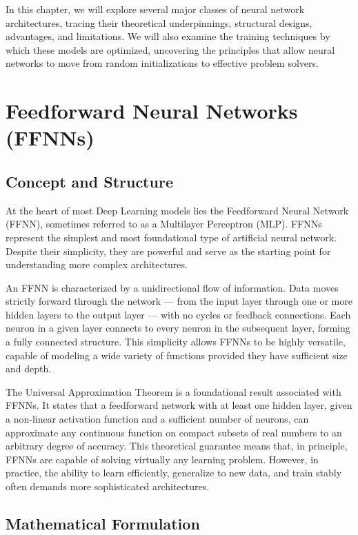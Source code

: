 \documentclass{book}
\begin{document}
In this chapter, we will explore several major classes of neural network 
architectures, tracing their theoretical underpinnings, structural designs, 
advantages, and limitations. We will also examine the training techniques by 
which these models are optimized, uncovering the principles that allow neural 
networks to move from random initializations to effective problem solvers.

\section{Feedforward Neural Networks (FFNNs)}

\subsection{Concept and Structure}

At the heart of most Deep Learning models lies the Feedforward Neural Network 
(FFNN), sometimes referred to as a Multilayer Perceptron (MLP). FFNNs represent 
the simplest and most foundational type of artificial neural network. Despite 
their simplicity, they are powerful and serve as the starting point for 
understanding more complex architectures.

An FFNN is characterized by a unidirectional flow of information. Data moves 
strictly forward through the network — from the input layer through one or more 
hidden layers to the output layer — with no cycles or feedback connections. Each 
neuron in a given layer connects to every neuron in the subsequent layer, 
forming a fully connected structure. This simplicity allows FFNNs to be highly 
versatile, capable of modeling a wide variety of functions provided they have 
sufficient size and depth.

The Universal Approximation Theorem is a foundational result associated with 
FFNNs. It states that a feedforward network with at least one hidden layer, 
given a non-linear activation function and a sufficient number of neurons, can 
approximate any continuous function on compact subsets of real numbers to an 
arbitrary degree of accuracy. This theoretical guarantee means that, in 
principle, FFNNs are capable of solving virtually any learning problem. However, 
in practice, the ability to learn efficiently, generalize to new data, and train 
stably often demands more sophisticated architectures.

\subsection{Mathematical Formulation}
\end{document}

